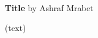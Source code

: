 \documentclass[12pt]{article}
\author{Ashraf Mrabet}
\date{}
\begin{document}
	\begin{center}
		\large
		{\bf Title} {\small by Ashraf Mrabet}
	\end{center}
	\normalsize
	(text)
	
\end{document}
